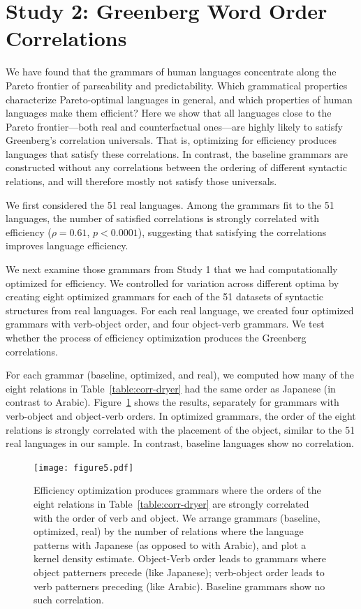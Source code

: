 \documentclass[9pt,twocolumn,twoside,lineno]{pnas-new}
\begin{document}
\section*{Study 2: Greenberg Word Order Correlations}
\label{sec:greenberg}

We have found that the grammars of human languages concentrate along the Pareto frontier of parseability and predictability.
Which grammatical properties characterize Pareto-optimal languages in general, and which properties of human languages make them efficient?
Here we show that all languages close to the Pareto frontier---both real and counterfactual ones---are highly likely to satisfy Greenberg's correlation universals.
That is, optimizing for efficiency produces languages that satisfy these correlations.
In contrast, the baseline grammars are constructed without any correlations between the ordering of different syntactic relations, and will therefore mostly not satisfy those universals.

We first considered the 51 real languages.
Among the grammars fit to the 51 languages, the number of satisfied correlations is strongly correlated with efficiency ($\rho = 0.61$, $p<0.0001$), suggesting that satisfying the correlations improves language efficiency.


We next examine those grammars from Study 1 that we had computationally optimized for efficiency.
We controlled for variation across different optima by creating eight optimized grammars for each of the 51 datasets of syntactic structures from real languages.
For each real language, we created four optimized grammars with verb-object order, and four object-verb grammars.
We test whether the process of efficiency optimization produces the Greenberg correlations.


For each grammar (baseline, optimized, and real), we computed how many of the eight relations in Table~\ref{table:corr-dryer} had the same order as  Japanese (in contrast to Arabic).
Figure~\ref{fig:joint} shows the results, separately for grammars with verb-object and object-verb orders.
In optimized grammars, the order of the eight relations is strongly correlated with the placement of the object, similar to the 51 real languages in our sample.
In contrast, baseline languages show no correlation.


\begin{figure}
	\begin{center}
		\texttt{[image: figure5.pdf]}
	\end{center}
    \caption{
    Efficiency optimization produces grammars where the orders of the eight relations in Table~\ref{table:corr-dryer} are strongly correlated with the order of verb and object. We arrange grammars (baseline, optimized, real) by the number of relations where the language patterns with Japanese (as opposed to with Arabic), and plot a kernel density estimate. Object-Verb order leads to grammars where object patterners precede (like Japanese); verb-object order leads to verb patterners preceding (like Arabic). Baseline grammars show no such correlation.
    }
    \label{fig:joint}
\end{figure}
\end{document}
